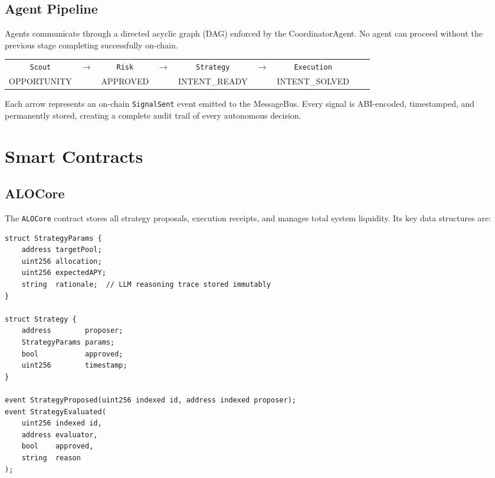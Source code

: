 \documentclass[11pt,a4paper]{article}
\begin{document}
\subsection{Agent Pipeline}

Agents communicate through a directed acyclic graph (DAG) enforced by the CoordinatorAgent.
No agent can proceed without the previous stage completing successfully on-chain.

\begin{center}
\begin{tabular}{ccccccccc}
  \texttt{Scout} & $\longrightarrow$ & \texttt{Risk} & $\longrightarrow$ & \texttt{Strategy}
  & $\longrightarrow$ & \texttt{Execution} \\[4pt]
  \scriptsize OPPORTUNITY & & \scriptsize APPROVED & & \scriptsize INTENT\_READY
  & & \scriptsize INTENT\_SOLVED
\end{tabular}
\end{center}

Each arrow represents an on-chain \texttt{SignalSent} event emitted to the MessageBus. Every
signal is ABI-encoded, timestamped, and permanently stored, creating a complete audit trail
of every autonomous decision.

\section{Smart Contracts}

\subsection{ALOCore}

The \texttt{ALOCore} contract stores all strategy proposals, execution receipts, and manages
total system liquidity. Its key data structures are:

\begin{lstlisting}[caption=ALOCore Strategy Data Structures]
struct StrategyParams {
    address targetPool;
    uint256 allocation;
    uint256 expectedAPY;
    string  rationale;  // LLM reasoning trace stored immutably
}

struct Strategy {
    address        proposer;
    StrategyParams params;
    bool           approved;
    uint256        timestamp;
}

event StrategyProposed(uint256 indexed id, address indexed proposer);
event StrategyEvaluated(
    uint256 indexed id,
    address evaluator,
    bool    approved,
    string  reason
);
\end{lstlisting}
\end{document}
